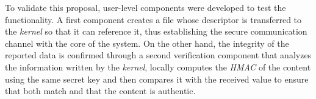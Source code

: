 To validate this proposal, user-level components were developed to test the functionality. A first component creates a file whose descriptor is transferred to the \textit{kernel} so that it can reference it, thus establishing the secure communication channel with the core of the system.
On the other hand, the integrity of the reported data is confirmed through a second verification component that analyzes the information written by the \textit{kernel}, locally computes the \textit{HMAC} of the content using the same secret key and then compares it with the received value to ensure that both match and that the content is authentic.\\
